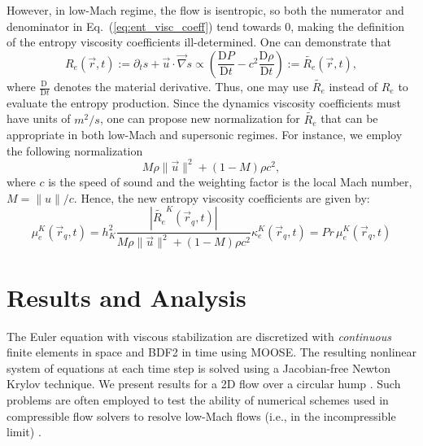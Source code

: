 \documentclass{anstrans}
\newcommand{\grad}{\vec{\nabla}}
\newcommand{\be}{\begin{equation}}
\newcommand{\ee}{\end{equation}}
\newcommand{\resi}{R_e}
\newcommand{\resinew}{\widetilde{\resi}}
\newcommand{\matder}[1]{\frac{\textrm{D} #1}{\textrm{D} t}}
\newcommand{\eqt}[1]{Eq.~(\ref{#1})}                     %
\begin{document}
However, in low-Mach regime, the flow is isentropic, so both the numerator and denominator in \eqt{eq:ent_visc_coeff} tend towards 0, making
the definition of the entropy viscosity coefficients ill-determined. One can demonstrate \cite{marco_low_mach_paper} that
\begin{equation}
\label{eq:ent_res}
\resi(\vec{r},t) := \partial_t s + \vec{u} \cdot \grad s \propto \left( \matder{P} - c^2 \matder{\rho} \right)  :=\resinew(\vec{r},t) ,
\end{equation} 
where $\matder{\ }$ denotes the material derivative. Thus, one may use $\resinew$ instead of $\resi$ to evaluate the entropy production. Since the dynamics viscosity coefficients must have units of $m^2/s$, one can propose new normalization for $\resinew$ that can be appropriate in both low-Mach and supersonic regimes. For instance, we employ the following normalization
\be
M \rho \|\vec{u}\|^2 + (1-M) \rho c^2,
\ee
where $c$ is the speed of sound and the weighting factor is the local Mach number, $M=\|u\|/c$. Hence, the new entropy viscosity coefficients are given by:
\begin{subequations}
\label{eq:ent_visc_coeff2}
\begin{equation}
\mu^K_e(\vec{r}_q,t) =  h_K^2 \frac{| \resinew^K(\vec{r}_q,t) |}{M \rho \|\vec{u}\|^2 + (1-M) \rho c^2}  
\end{equation}
\begin{equation}
\kappa^K_e(\vec{r}_q,t) = Pr \, \mu^K_e(\vec{r}_q,t)
\end{equation}
\end{subequations}

\section{Results and Analysis}

The Euler equation with viscous stabilization are discretized with {\it continuous} finite elements in space and BDF2 in time using MOOSE. The resulting nonlinear system of equations at each time step is solved using a Jacobian-free Newton Krylov technique. We present results for a 2D flow over a circular hump \cite{Hump}. Such problems are often employed to test the ability of numerical schemes used in compressible flow solvers to resolve low-Mach flows (i.e., in the incompressible limit) \cite{LowMach1}. 
\end{document}
